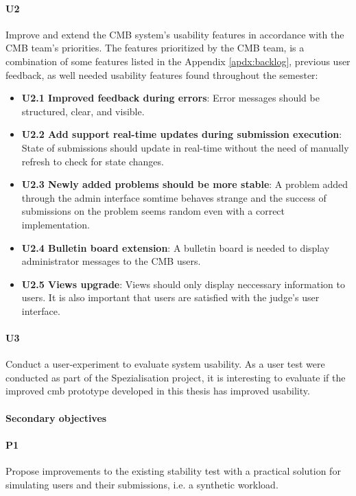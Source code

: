 \paragraph*{U2} Improve and extend the CMB system's usability features in accordance with the CMB team's priorities. The features prioritized by the CMB team, is a combination of some features listed in the Appendix \ref{apdx:backlog}, previous user feedback, as well needed usability features found throughout the semester:
  \begin{itemize}
    \item \textbf{U2.1 Improved feedback during errors}: Error messages should be structured, clear, and visible.
    \item \textbf{U2.2 Add support real-time updates during submission execution}: State of submissions should update in real-time without the need of manually refresh to check for state changes.
    \item \textbf{U2.3 Newly added problems should be more stable}: A problem added through the admin interface somtime behaves strange and the success of submissions on the problem seems random even with a correct implementation.
    \item \textbf{U2.4 Bulletin board extension}: A bulletin board is needed to display administrator messages to the CMB users.
    \item \textbf{U2.5 Views upgrade}: Views should only display neccessary information to users. It is also important that users are satisfied with the judge's user interface.
  \end{itemize}

\paragraph*{U3} Conduct a user-experiment to evaluate system usability. As a user test were conducted as part of the Spezialisation project, it is interesting to evaluate if the improved \gls{cmb} prototype developed in this thesis has improved usability.

\paragraph*{Secondary objectives} \hfill

\paragraph*{P1} Propose improvements to the existing stability test with a practical solution for simulating users and their submissions, i.e. a synthetic workload.

